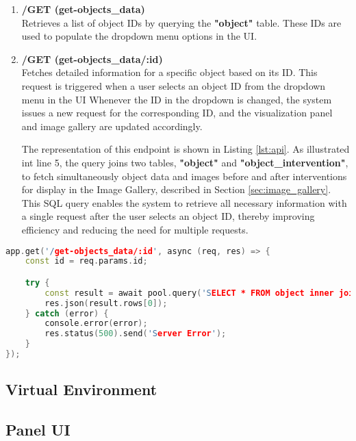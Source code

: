 \begin{enumerate}
  \item \textbf{/GET (get-objects\_data)}
  \\Retrieves a list of object IDs by querying the \textbf{"object"} table. These IDs are used to populate the dropdown menu options in the \gls{UI}.

  \item \textbf{/GET (get-objects\_data/:id)}
  \\Fetches detailed information for a specific object based on its ID. This request is triggered when a user selects an object ID from the dropdown menu in the \gls{UI}
  Whenever the ID in the dropdown is changed, the system issues a new request for the corresponding ID, and the visualization panel and image gallery are updated accordingly.

  The representation of this endpoint is shown in Listing \ref{lst:api}. As illustrated int line 5, the query joins two tables, \textbf{"object"} and \textbf{"object\_intervention"}, to fetch simultaneously object data and images before and after interventions for display in the Image Gallery, described in Section \ref{sec:image_gallery}. 
  This SQL query enables the system to retrieve all necessary information with a single request after the user selects an object ID, thereby improving efficiency and reducing the need for multiple requests.

\end{enumerate}

\begin{lstlisting}[language=C++, caption={Example of defining an API endpoint in Node.js.},label={lst:api}]
  app.get('/get-objects_data/:id', async (req, res) => {
    const id = req.params.id;

    try {
        const result = await pool.query('SELECT * FROM object inner join object_intervention on object.id = object_intervention.object_id WHERE object.id = $1', [id]);
        res.json(result.rows[0]);
    } catch (error) {
        console.error(error);
        res.status(500).send('Server Error');
    }
});
\end{lstlisting}


\subsection{Virtual Environment}

\subsection*{Panel \gls{UI}}

